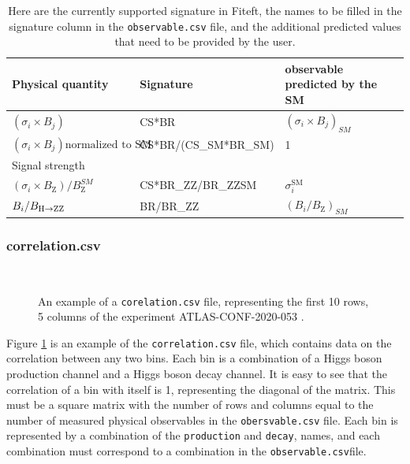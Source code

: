 \documentclass[12pt]{article}
\newlength{\mywidth}\setlength{\mywidth}{14.5cm}
\newcommand{\SM}{\text{SM}}
\begin{document}
  \begin{table}
   \begin{tabular}{|l|l|l|l|}
 \hline
 Physical quantity & Signature & observable predicted by the SM \\[0.25cm] \hline
 $(\sigma_i \times B_j)$  & CS*BR & $(\sigma_i \times B_j)_{SM}$  \\[0.25cm] \hline
 $(\sigma_i \times B_j) \text{normalized to SM}$ & CS*BR/(CS\_SM*BR\_SM)  & 1 \\
 Signal strength && \\ [0.25cm] \hline
 $(\sigma_i \times B_\mathrm{Z} )/B_\mathrm{Z}^{SM}$ & CS*BR\_ZZ/BR\_ZZSM  & $\sigma^{\SM}_i$\\[0.25cm] \hline
 $B_i/B_{\rm H\to ZZ}$ & BR/BR\_ZZ &  $(B_i/B_\mathrm{Z})_{SM}$ \\ \hline
 \end{tabular}
 \caption{Here are the currently supported signature in Fiteft, the names to be filled in the signature column in the \texttt{observable.csv} file, and the additional predicted values that need to be provided by the user.}
 \label{table:signature}
 \end{table}
 
 \subsubsection{correlation.csv}
 
 \begin{figure}[!h]
 \resizebox{\textwidth}{!}{
 
 }\\
 \caption{An example of a \texttt{corelation.csv} file, representing the first 10 rows, 5 columns of the experiment ATLAS-CONF-2020-053 \cite{ATLAS:2020naq}. \label{fig:cor_table}}
 \end{figure}
 
Figure  \ref{fig:cor_table} is an example of the \verb|correlation.csv| file, which contains data on the correlation between any two bins. Each bin is a combination of a Higgs boson production channel and a Higgs boson decay channel. It is easy to see that the correlation of a bin with itself is 1, representing the diagonal of the matrix. This must be a square matrix with the number of rows and columns equal to the number of measured physical observables in the \verb|obersvable.csv| file. Each bin is represented by a combination of the \verb|production| and \verb|decay|, names, and each combination must correspond to a combination in the \verb|observable.csv|file.
\end{document}

